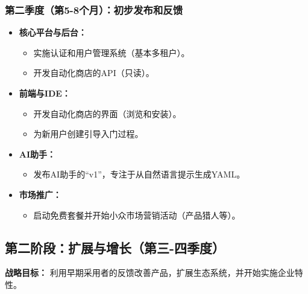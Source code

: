 \documentclass[11pt, a4paper, oneside]{article}
\begin{document}
\subsubsection*{第二季度（第5-8个月）：初步发布和反馈}
\begin{itemize}[leftmargin=*]
    \item \textbf{核心平台与后台：}
    \begin{itemize}
        \item 实施认证和用户管理系统（基本多租户）。
        \item 开发自动化商店的API（只读）。
    \end{itemize}
    \item \textbf{前端与IDE：}
    \begin{itemize}
        \item 开发自动化商店的界面（浏览和安装）。
        \item 为新用户创建引导入门过程。
    \end{itemize}
    \item \textbf{AI助手：}
    \begin{itemize}
        \item 发布AI助手的“v1”，专注于从自然语言提示生成YAML。
    \end{itemize}
    \item \textbf{市场推广：}
    \begin{itemize}
        \item 启动免费套餐并开始小众市场营销活动（产品猎人等）。
    \end{itemize}
\end{itemize}

\clearpage

\subsection{第二阶段：扩展与增长（第三-四季度）}
\textbf{战略目标：} 利用早期采用者的反馈改善产品，扩展生态系统，并开始实施企业特性。
\end{document}
